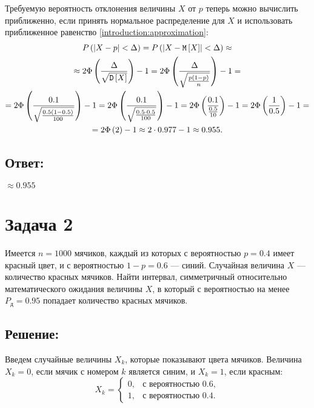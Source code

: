 Требуемую вероятность отклонения величины $X$ от $p$ теперь можно вычислить приближенно, если принять нормальное распределение для $X$ и использовать приближенное
равенство \eqref{introduction:approximation}:
\begin{multline}
    P \left ( \left | X - p \right | < \Delta \right )
    = P \left ( \left | X - \mathtt{M} \left [ X \right ] \right | < \Delta \right ) \approx \\
    \approx 2 \Phi \left ( \frac{\Delta}{\sqrt{\mathtt{D} \left [ X \right ]}} \right ) - 1
    = 2 \Phi \left ( \frac{\Delta}{\sqrt{\frac{p (1-p)}{n}}} \right ) - 1 = \\
    = 2 \Phi \left ( \frac{0.1}{\sqrt{\frac{0.5 (1-0.5)}{100}}} \right ) - 1
    = 2 \Phi \left ( \frac{0.1}{\sqrt{\frac{0.5 \cdot 0.5}{100}}} \right ) - 1
    = 2 \Phi \left ( \frac{0.1}{\frac{0.5}{10}} \right ) - 1
    = 2 \Phi \left ( \frac{1}{0.5} \right ) - 1 = \\
    = 2 \Phi \left ( 2 \right ) - 1
    \approx 2 \cdot 0.977 - 1
    \approx 0.955 .
\end{multline}

\subsection*{Ответ:}
$\approx 0.955$

\section*{Задача 2}

Имеется $n = 1000$ мячиков, каждый из которых с вероятностью $p = 0.4$ имеет красный цвет, и с вероятностью $1 - p = 0.6$ --- синий.
Случайная величина $X$ --- количество красных мячиков. Найти интервал, симметричный относительно математического ожидания величины $X$,
в который с вероятностью на менее $P_\text{д} = 0.95$ попадает количество красных мячиков.
\subsection*{Решение:}
Введем случайные величины $X_k$, которые показывают цвета мячиков. Величина $X_k = 0$, если мячик с номером $k$ является синим, и $X_k = 1$, если красным:
\begin{equation}
    X_k =
    \left \{
    \begin{array}{ll}
        0, & \text{с вероятностью } 0.6 , \\
        1, & \text{с вероятностью } 0.4 .
    \end{array}
    \right .
\end{equation}

